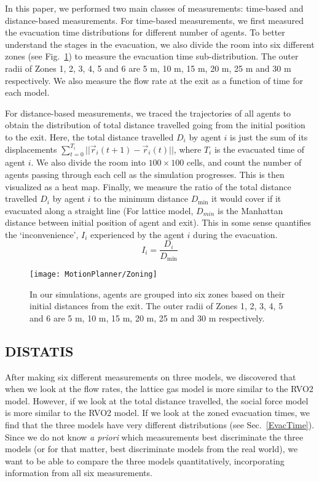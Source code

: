In this paper, we performed two main classes of measurements: time-based and distance-based measurements. For time-based measurements, we first measured the evacuation time distributions for different number of agents. To better understand the stages in the evacuation, we also divide the room into six different zones (see Fig.~\ref{fig:Zoning}) to measure the evacuation time sub-distribution. The outer radii of Zones 1, 2, 3, 4, 5 and 6 are 5 m, 10 m, 15 m, 20 m, 25 m and 30 m respectively. We also measure the flow rate at the exit as a function of time for each model.

For distance-based measurements, we traced the trajectories of all agents to obtain the distribution of total distance travelled going from the initial position to the exit. Here, the total distance travelled $D_i$ by agent $i$ is just the sum of its displacements $\sum^{T_i}_{t=0}||\vec{r}_i(t+1)-\vec{r}_i(t)||$, where $T_i$ is the evacuated time of agent $i$. We also divide the room into $100 \times 100$ cells, and count the number of agents passing through each cell as the simulation progresses. This is then visualized as a heat map. Finally, we measure the ratio of the total distance travelled $D_i$ by agent $i$ to the minimum distance $D_{\min}$ it would cover if it evacuated along a straight line (For lattice model, $D_{min}$ is the Manhattan distance between initial position of agent and exit). This in some sense quantifies the `inconvenience', $I_i$ experienced by the agent $i$ during the evacuation.
\begin{equation}\label{eqn:Incon}
I_i=\frac{D_i}{D_{\min}}
\end{equation}

\begin{figure}[!tb]
\begin{center}
\texttt{[image: MotionPlanner/Zoning]}
\caption[Zonal division of environment]{In our simulations, agents are grouped into six zones based on their initial distances from the exit. The outer radii of Zones 1, 2, 3, 4, 5 and 6 are 5 m, 10 m, 15 m, 20 m, 25 m and 30 m respectively.}
\label{fig:Zoning}
\end{center}
\end{figure}


\subsection{DISTATIS}\label{sec:DISTATIS}

After making six different measurements on three models, we discovered that when we look at the flow rates, the lattice gas model is more similar to the RVO2 model. However, if we look at the total distance travelled, the social force model is more similar to the RVO2 model. If we look at the zoned evacuation times, we find that the three models have very different distributions (see Sec.~\ref{EvacTime}). Since we do not know \emph{a priori} which measurements best discriminate the three models (or for that matter, best discriminate models from the real world), we want to be able to compare the three models quantitatively, incorporating information from all six measurements.

